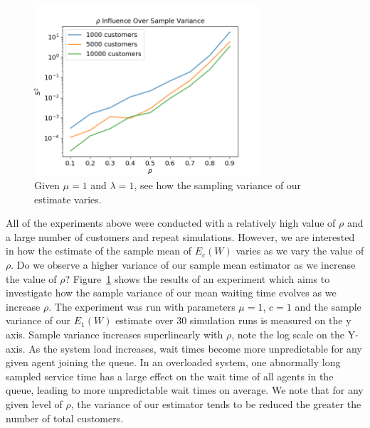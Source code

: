 \documentclass{article}
\begin{document}
    \begin{figure}[!ht]
        \centering
        \includegraphics[width=0.75\textwidth]{pictures/part_2/samp_var_q2.png}
        \caption{Given $\mu = 1$ and $\lambda = 1$, see how the sampling variance of our estimate varies.  }
        \label{fig:samp_var}
    \end{figure}

    All of the experiments above were conducted with a relatively high value of $\rho$ and a large number of customers and repeat simulations. However, we are interested in how the estimate of the sample mean of $E_c(W)$ varies as we vary the value of $\rho$. Do we observe a higher variance of our sample mean estimator as we increase the value of $\rho$? Figure~\ref{fig:samp_var} shows the results of an experiment which aims to investigate how the sample variance of our mean waiting time evolves as we increase $\rho$. The experiment was run with parameters $\mu = 1$, $c = 1$ and the sample variance of our $E_1(W)$ estimate over 30 simulation runs is measured on the y axis. Sample variance increases superlinearly with $\rho$, note the log scale on the Y-axis. As the system load increases, wait times become more unpredictable for any given agent joining the queue. In an overloaded system, one abnormally long sampled service time has a large effect on the wait time of all agents in the queue, leading to more unpredictable wait times on average. We note that for any given level of $\rho$, the variance of our estimator tends to be reduced the greater the number of total customers.\\
\end{document}
